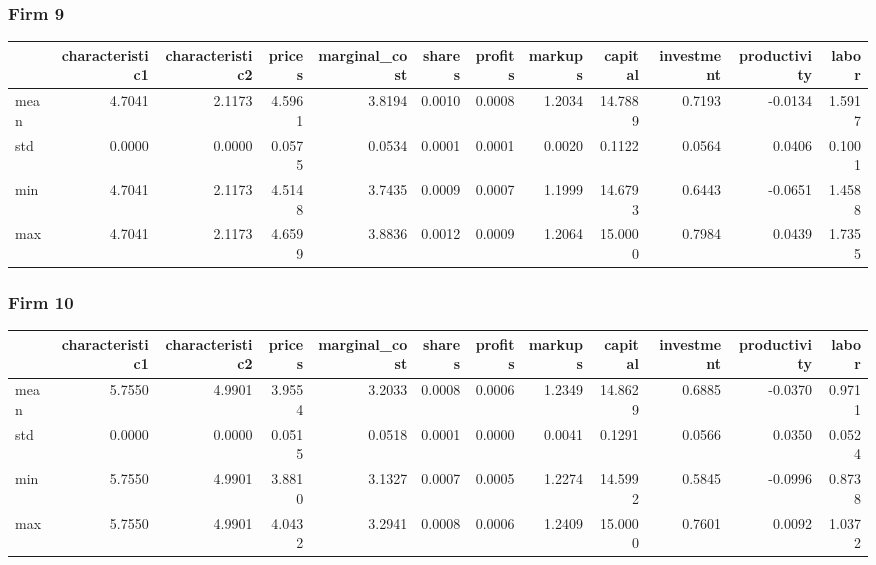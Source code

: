  \subsubsection*{Firm 9}
\begin{tabular}{lrrrrrrrrrrr}
\toprule
{} &  characteristic1 &  characteristic2 &  prices &  marginal\_cost &  shares &  profits &  markups &  capital &  investment &  productivity &  labor \\
\midrule
mean &           4.7041 &           2.1173 &  4.5961 &         3.8194 &  0.0010 &   0.0008 &   1.2034 &  14.7889 &      0.7193 &       -0.0134 & 1.5917 \\
std  &           0.0000 &           0.0000 &  0.0575 &         0.0534 &  0.0001 &   0.0001 &   0.0020 &   0.1122 &      0.0564 &        0.0406 & 0.1001 \\
min  &           4.7041 &           2.1173 &  4.5148 &         3.7435 &  0.0009 &   0.0007 &   1.1999 &  14.6793 &      0.6443 &       -0.0651 & 1.4588 \\
max  &           4.7041 &           2.1173 &  4.6599 &         3.8836 &  0.0012 &   0.0009 &   1.2064 &  15.0000 &      0.7984 &        0.0439 & 1.7355 \\
\bottomrule
\end{tabular}


 \subsubsection*{Firm 10}
\begin{tabular}{lrrrrrrrrrrr}
\toprule
{} &  characteristic1 &  characteristic2 &  prices &  marginal\_cost &  shares &  profits &  markups &  capital &  investment &  productivity &  labor \\
\midrule
mean &           5.7550 &           4.9901 &  3.9554 &         3.2033 &  0.0008 &   0.0006 &   1.2349 &  14.8629 &      0.6885 &       -0.0370 & 0.9711 \\
std  &           0.0000 &           0.0000 &  0.0515 &         0.0518 &  0.0001 &   0.0000 &   0.0041 &   0.1291 &      0.0566 &        0.0350 & 0.0524 \\
min  &           5.7550 &           4.9901 &  3.8810 &         3.1327 &  0.0007 &   0.0005 &   1.2274 &  14.5992 &      0.5845 &       -0.0996 & 0.8738 \\
max  &           5.7550 &           4.9901 &  4.0432 &         3.2941 &  0.0008 &   0.0006 &   1.2409 &  15.0000 &      0.7601 &        0.0092 & 1.0372 \\
\bottomrule
\end{tabular}


